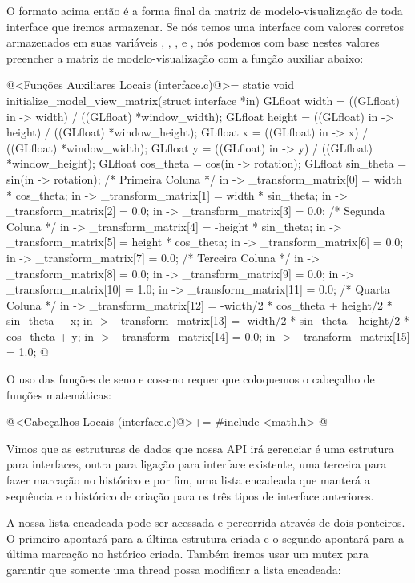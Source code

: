 O formato acima então é a forma final da matriz de modelo-visualização
de toda interface que iremos armazenar. Se nós temos uma interface com
valores corretos armazenados em suas variáveis ,
, ,  e
, nós podemos com base nestes valores preencher
a matriz de modelo-visualização com a função auxiliar abaixo:

\iniciocodigo
@<Funções Auxiliares Locais (interface.c)@>=
static void initialize_model_view_matrix(struct interface *in){
  GLfloat width = ((GLfloat) in -> width) / ((GLfloat) *window_width);
  GLfloat height = ((GLfloat) in -> height) / ((GLfloat) *window_height);
  GLfloat x = ((GLfloat) in -> x) / ((GLfloat) *window_width);
  GLfloat y = ((GLfloat) in -> y) / ((GLfloat) *window_height);
  GLfloat cos_theta = cos(in -> rotation);
  GLfloat sin_theta = sin(in -> rotation);
  /* Primeira Coluna */
  in -> _transform_matrix[0] = width * cos_theta;
  in -> _transform_matrix[1] = width * sin_theta;
  in -> _transform_matrix[2] = 0.0;
  in -> _transform_matrix[3] = 0.0;
  /* Segunda Coluna */
  in -> _transform_matrix[4] = -height * sin_theta;
  in -> _transform_matrix[5] = height * cos_theta;
  in -> _transform_matrix[6] = 0.0;
  in -> _transform_matrix[7] = 0.0;
  /* Terceira Coluna */
  in -> _transform_matrix[8] = 0.0;
  in -> _transform_matrix[9] = 0.0;
  in -> _transform_matrix[10] = 1.0;
  in -> _transform_matrix[11] = 0.0;
  /* Quarta Coluna */
  in -> _transform_matrix[12] = -width/2 * cos_theta + height/2 * sin_theta + x;
  in -> _transform_matrix[13] = -width/2 * sin_theta - height/2 * cos_theta + y;
  in -> _transform_matrix[14] = 0.0;
  in -> _transform_matrix[15] = 1.0;
}
@
\fimcodigo

O uso das funções de seno e cosseno requer que coloquemos o cabeçalho
de funções matemáticas:

\iniciocodigo
@<Cabeçalhos Locais (interface.c)@>+=
#include <math.h>
@
\fimcodigo


Vimos que as estruturas de dados que nossa API irá gerenciar é uma
estrutura para interfaces, outra para ligação para interface
existente, uma terceira para fazer marcação no histórico e por fim,
uma lista encadeada que manterá a sequência e o histórico de criação
para os três tipos de interface anteriores.

A nossa lista encadeada pode ser acessada e percorrida através de dois
ponteiros. O primeiro apontará para a última estrutura criada e o
segundo apontará para a última marcação no hstórico criada. Também
iremos usar um mutex para garantir que somente uma thread possa
modificar a lista encadeada:

